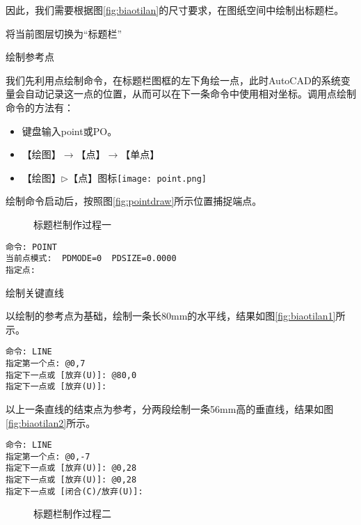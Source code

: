 因此，我们需要根据图\ref{fig:biaotilan}的尺寸要求，在图纸空间中绘制出标题栏。
\begin{procedure}
\item 将当前图层切换为“标题栏”
\item 绘制参考点

我们先利用点绘制命令，在标题栏图框的左下角绘一点，此时AutoCAD的系统变量会自动记录这一点的位置，从而可以在下一条命令中使用相对坐标。调用点绘制命令的方法有：
\begin{itemize}
\item 键盘输入point或PO。
\item 【绘图】$\rightarrow$【点】$\rightarrow$【单点】
\item 【绘图】$\triangleright$【点】图标\texttt{[image: point.png]}
\end{itemize}
绘制命令启动后，按照图\ref{fig:pointdraw}所示位置捕捉端点。
\begin{figure}[htbp]
\centering
{}\hspace{20pt}
\hspace{20pt}
\caption{标题栏制作过程一}
\end{figure}
\begin{lstlisting}
命令: POINT
当前点模式:  PDMODE=0  PDSIZE=0.0000
指定点:
\end{lstlisting}
\item 绘制关键直线

以绘制的参考点为基础，绘制一条长80mm的水平线，结果如图\ref{fig:biaotilan1}所示。
\begin{lstlisting}
命令: LINE
指定第一个点: @0,7
指定下一点或 [放弃(U)]: @80,0
指定下一点或 [放弃(U)]:
\end{lstlisting}
以上一条直线的结束点为参考，分两段绘制一条56mm高的垂直线，结果如图\ref{fig:biaotilan2}所示。
\begin{lstlisting}
命令: LINE
指定第一个点: @0,-7
指定下一点或 [放弃(U)]: @0,28
指定下一点或 [放弃(U)]: @0,28
指定下一点或 [闭合(C)/放弃(U)]:
\end{lstlisting}

\begin{figure}[htbp]
\centering
{}\hspace{20pt}
\hspace{20pt}
\caption{标题栏制作过程二}
\end{figure}


\end{procedure}
